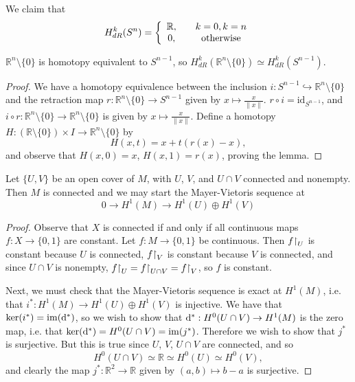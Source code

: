 \begin{xmpl}[Cohomology of $S^n$]
We claim that
$$
  H^k_{dR}(S^n)
= \left\{
    \begin{array}{c c}
      \mathbb{R}, & \quad k = 0, k = n \\
      0,          & \quad \text{otherwise}
    \end{array}
  \right.
$$

\begin{lemma}
$\mathbb{R}^n \setminus \{ 0 \}$ is homotopy equivalent to $S^{n-1}$,
so $H_{dR}^k(\mathbb{R}^n \setminus \{ 0 \}) \simeq H^k_{dR}(S^{n-1})$.
\end{lemma}

\begin{proof}
We have a homotopy equivalence between the inclusion
$i : S^{n-1} \hookrightarrow \mathbb{R}^n \setminus \{ 0 \}$ and the
retraction map
$r : \mathbb{R}^n \setminus \{ 0 \} \to S^{n-1}$ given by
$x \mapsto \frac{x}{\| x \|}$. $r \circ i = \mathrm{id}_{S^{n-1}}$,
and
$i \circ r : \mathbb{R}^n \setminus \{ 0 \} \to \mathbb{R}^n \setminus
\{ 0 \}$
is given by $x \mapsto \frac{x}{\| x \|}$. Define a homotopy
$
  H
: (\mathbb{R} \setminus \{ 0 \}) \times I \to \mathbb{R}^n \setminus
\{ 0 \}
$
by
$$
H(x, t) = x + t(r(x) - x),
$$
and observe that $H(x, 0) = x$,
$H(x, 1) = r(x)$, proving the lemma.
\end{proof}

\begin{lemma}
Let $\{ U, V \}$ be an open cover of $M$, with
$U$, $V$, and $U \cap V$ connected and nonempty. Then
$M$ is connected and we may start the Mayer-Vietoris sequence at
$$
0 \to H^1(M) \to H^1(U) \oplus H^1(V)
$$
\end{lemma}

\begin{proof}
Observe that $X$ is connected if and only if all continuous maps
$f : X \to \{ 0, 1 \}$ are constant. Let $f : M \to \{ 0, 1 \}$ be
continuous. Then $f\mathord{\upharpoonright}_U$ is constant because $U$ is connected,
$f\mathord{\upharpoonright}_V$ is constant because $V$ is connected, and since
$U \cap V$ is nonempty,
$f\mathord{\upharpoonright}_U = f\mathord{\upharpoonright}_{U \cap V} = f\mathord{\upharpoonright}_V$, so
$f$ is constant.

Next, we must check that the Mayer-Vietoris sequence is exact at
$H^1(M)$, i.e. that $i^\ast: H^1(M) \to H^1(U) \oplus H^1(V)$ is
injective. We have that $\ker(i^\ast) = \mathrm{im}(\mathop{}\!\mathrm{d}^\ast)$, so we
wish to show that $\mathop{}\!\mathrm{d}^\ast : H^0(U \cap V) \to H^1(M)$ is the zero
map, i.e. that
$\ker(\mathop{}\!\mathrm{d}^\ast) = H^0(U \cap V) = \mathrm{im}(j^\ast)$. Therefore we
wish to show that $j^\ast$ is surjective. But this is true since
$U$, $V$, $U \cap V$ are connected, and so
$$
  H^0(U \cap V) \simeq \mathbb{R} \simeq H^0(U) \simeq H^0(V),
$$
and clearly the map $j^\ast : \mathbb{R}^2 \to \mathbb{R}$ given by
$(a, b) \mapsto b - a$ is surjective.
\end{proof}


\end{xmpl}
